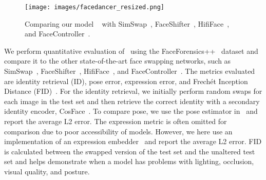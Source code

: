 \documentclass[10pt,twocolumn,letterpaper]{article}
\newcommand{\ft}[1]{FaceDancer{#1}}
\newcommand{\fti}[1]{\textit{FaceDancer}{#1}}
\begin{document}
\begin{table}[t!]
\caption{Quantitative experiments on FaceForensics++~\cite{faceforensics++}. See Table~\ref{t:ablations} for the definition of each \fti~configuration (Config B to D). These models has been trained for 500k iterations.}
\label{t:compare}
\begin{center}
\end{center}
\end{table}

\begin{figure*}[!t]
\centering
\texttt{[image: images/facedancer\_resized.png]}
\caption{Comparing our model \ft~ with SimSwap~\cite{simswap}, FaceShifter~\cite{faceshifter}, HifiFace~\cite{hififace}, and FaceController~\cite{facecontroller}.}
\label{fig:compall}
\end{figure*}

We perform quantitative evaluation of  \fti~using the FaceForensics++~\cite{faceforensics++} dataset and compare it to the other state-of-the-art face swapping networks, such as  SimSwap~\cite{simswap}, FaceShifter~\cite{faceshifter}, HifiFace~\cite{hififace}, and FaceController~\cite{facecontroller}. 
The metrics evaluated are identity retrieval (ID), pose error, expression error, and Frechét Inception Distance (FID)~\cite{fid}. 
For the identity retrieval, we initially perform random swaps for each image in the test set and then retrieve the correct identity with a secondary identity encoder, CosFace~\cite{cosface}. 
To compare pose, we use the  pose estimator in~\cite{pose}  and report the average L2 error. The expression metric is often omitted for comparison due to poor accessibility of models. However, we here use an implementation of an expression embedder~\cite{expression} and report the average L2 error. 
FID is calculated between the swapped version of the test set and the unaltered test set and helps demonstrate when a model has problems with lighting, occlusion, visual quality, and posture.
\end{document}
